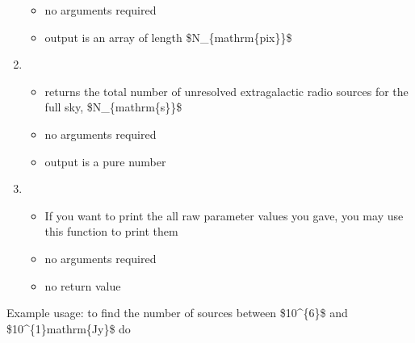 \documentclass[letterpaper,10pt,english]{sphinxmanual}
\begin{document}
\begin{enumerate}
\begin{itemize}
\item {} 
\sphinxAtStartPar
no arguments required

\item {} 
\sphinxAtStartPar
output is an array of length \$N\_\{mathrm\{pix\}\}\$

\end{itemize}

\item {} 
\sphinxAtStartPar
{}
\begin{itemize}
\item {} 
\sphinxAtStartPar
returns the total number of unresolved extragalactic radio sources
for the full sky, \$N\_\{mathrm\{s\}\}\$

\item {} 
\sphinxAtStartPar
no arguments required

\item {} 
\sphinxAtStartPar
output is a pure number

\end{itemize}

\item {} 
\sphinxAtStartPar
{}
\begin{itemize}
\item {} 
\sphinxAtStartPar
If you want to print the all raw parameter values you gave, you
may use this function to print them

\item {} 
\sphinxAtStartPar
no arguments required

\item {} 
\sphinxAtStartPar
no return value

\end{itemize}

\end{enumerate}

\sphinxAtStartPar
Example usage: to find the number of sources between \$10\textasciicircum{}\{\sphinxhyphen{}6\}\$ and
\$10\textasciicircum{}\{\sphinxhyphen{}1\}mathrm\{Jy\}\$ do

\begin{sphinxVerbatim}[commandchars=\\\{\}]
  
  
\end{sphinxVerbatim}
\end{document}

